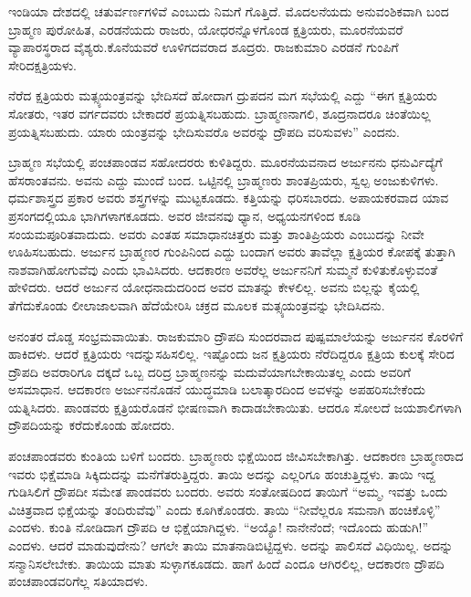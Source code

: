 \vskip 0.1cm

ಇಂಡಿಯಾ ದೇಶದಲ್ಲಿ ಚತುರ್ವರ್ಣಗಳಿವೆ ಎಂಬುದು ನಿಮಗೆ ಗೊತ್ತಿದೆ. ಮೊದಲನೆಯದು ಅನುವಂಶಿಕವಾಗಿ ಬಂದ ಬ್ರಾಹ್ಮಣ ಪುರೋಹಿತ, ಎರಡನೆಯದು ರಾಜರು, ಯೋಧರನ್ನೊಳಗೊಂಡ ಕ್ಷತ್ರಿಯರು, ಮೂರನೆಯವರೆ ವ್ಯಾಪಾರಸ್ಥರಾದ ವೈಶ್ಯರು.\break ಕೊನೆಯವರೆ ಊಳಿಗದವರಾದ ಶೂದ್ರರು. ರಾಜಕುಮಾರಿ ಎರಡನೆ ಗುಂಪಿಗೆ ಸೇರಿದ\break ಕ್ಷತ್ರಿಯಳು.

\vskip 0.1cm

ನೆರೆದ ಕ್ಷತ್ರಿಯರು ಮತ್ಸ್ಯಯಂತ್ರವನ್ನು ಭೇದಿಸದೆ ಹೋದಾಗ ದ್ರುಪದನ ಮಗ ಸಭೆಯಲ್ಲಿ ಎದ್ದು “ಈಗ ಕ್ಷತ್ರಿಯರು ಸೋತರು, ಇತರ ವರ್ಗದವರು ಬೇಕಾದರೆ ಪ್ರಯತ್ನಿಸಬಹುದು. ಬ್ರಾಹ್ಮಣನಾಗಲಿ, ಶೂದ್ರನಾದರೂ ಚಿಂತೆಯಿಲ್ಲ ಪ್ರಯತ್ನಿಸಬಹುದು. ಯಾರು ಯಂತ್ರವನ್ನು ಭೇದಿಸುವರೊ ಅವರನ್ನು ದ್ರೌಪದಿ ವರಿಸುವಳು” ಎಂದನು.

\vskip 0.1cm

ಬ್ರಾಹ್ಮಣ ಸಭೆಯಲ್ಲಿ ಪಂಚಪಾಂಡವ ಸಹೋದರರು ಕುಳಿತಿದ್ದರು. ಮೂರನೆಯವನಾದ ಅರ್ಜುನನು ಧನುರ್ವಿದ್ಯೆಗೆ ಹೆಸರಾಂತವನು. ಅವನು ಎದ್ದು ಮುಂದೆ ಬಂದ. ಒಟ್ಟಿನಲ್ಲಿ ಬ್ರಾಹ್ಮಣರು ಶಾಂತಪ್ರಿಯರು, ಸ್ವಲ್ಪ ಅಂಜುಕುಳಿಗಳು. ಧರ್ಮಶಾಸ್ತ್ರದ ಪ್ರಕಾರ ಅವರು ಶಸ್ತ್ರಗಳನ್ನು ಮುಟ್ಟಕೂಡದು. ಕತ್ತಿಯನ್ನು ಧರಿಸಬಾರದು. ಅಪಾಯಕರವಾದ ಯಾವ ಪ್ರಸಂಗದಲ್ಲಿಯೂ ಭಾಗಿಗಳಾಗಕೂಡದು. ಅವರ ಜೀವನವು ಧ್ಯಾನ, ಅಧ್ಯಯನಗಳಿಂದ ಕೂಡಿ ಸಂಯಮಪೂರಿತವಾದುದು. ಅವರು ಎಂತಹ ಸಮಾಧಾನಚಿತ್ತರು ಮತ್ತು ಶಾಂತಿಪ್ರಿಯರು ಎಂಬುದನ್ನು ನೀವೇ ಊಹಿಸಬಹುದು. ಅರ್ಜುನ ಬ್ರಾಹ್ಮಣರ ಗುಂಪಿನಿಂದ ಎದ್ದು ಬಂದಾಗ ಅವರು ತಾವೆಲ್ಲಾ ಕ್ಷತ್ರಿಯರ ಕೋಪಕ್ಕೆ ತುತ್ತಾಗಿ ನಾಶವಾಗಿ\break ಹೋಗುವೆವು ಎಂದು ಭಾವಿಸಿದರು. ಆದಕಾರಣ ಅವರೆಲ್ಲ ಅರ್ಜುನನಿಗೆ ಸುಮ್ಮನೆ ಕುಳಿತುಕೊಳ್ಳುವಂತೆ ಹೇಳಿದರು. ಆದರೆ ಅರ್ಜುನ ಯೋಧನಾದುದರಿಂದ ಅವರ ಮಾತನ್ನು ಕೇಳಲಿಲ್ಲ. ಅವನು ಬಿಲ್ಲನ್ನು ಕೈಯಲ್ಲಿ ತೆಗೆದುಕೊಂಡು ಲೀಲಾಜಾಲವಾಗಿ ಹೆದೆಯೇರಿಸಿ ಚಕ್ರದ ಮೂಲಕ ಮತ್ಸ್ಯಯಂತ್ರವನ್ನು ಭೇದಿಸಿದನು.

ಅನಂತರ ದೊಡ್ಡ ಸಂಭ್ರಮವಾಯಿತು. ರಾಜಕುಮಾರಿ ದ್ರೌಪದಿ ಸುಂದರವಾದ ಪುಷ್ಪಮಾಲೆಯನ್ನು ಅರ್ಜುನನ ಕೊರಳಿಗೆ ಹಾಕಿದಳು. ಆದರೆ ಕ್ಷತ್ರಿಯರು ಇದನ್ನು\break ಸಹಿಸಲಿಲ್ಲ. ಇಷ್ಟೊಂದು ಜನ ಕ್ಷತ್ರಿಯರು ನೆರೆದಿದ್ದರೂ ಕ್ಷತ್ರಿಯ ಕುಲಕ್ಕೆ ಸೇರಿದ ದ್ರೌಪದಿ ಅವರಾರಿಗೂ ದಕ್ಕದೆ ಒಬ್ಬ ದರಿದ್ರ ಬ್ರಾಹ್ಮಣನನ್ನು ಮದುವೆಯಾಗಬೇಕಾಯಿತಲ್ಲ ಎಂದು ಅವರಿಗೆ ಅಸಮಾಧಾನ. ಆದಕಾರಣ ಅರ್ಜುನನೊಡನೆ ಯುದ್ಧಮಾಡಿ ಬಲಾತ್ಕಾರದಿಂದ ಅವಳನ್ನು ಅಪಹರಿಸಬೇಕೆಂದು ಯತ್ನಿಸಿದರು. ಪಾಂಡವರು ಕ್ಷತ್ರಿಯರೊಡನೆ ಭೀಷಣವಾಗಿ ಕಾದಾಡಬೇಕಾಯಿತು. ಆದರೂ ಸೋಲದೆ ಜಯಶಾಲಿಗಳಾಗಿ ದ್ರೌಪದಿಯನ್ನು ಕರೆದುಕೊಂಡು ಹೋದರು.

ಪಂಚಪಾಂಡವರು ಕುಂತಿಯ ಬಳಿಗೆ ಬಂದರು. ಬ್ರಾಹ್ಮಣರು ಭಿಕ್ಷೆಯಿಂದ ಜೀವಿಸಬೇಕಾಗಿತ್ತು. ಆದಕಾರಣ ಬ್ರಾಹ್ಮಣರಾದ ಇವರು ಭಿಕ್ಷೆಮಾಡಿ ಸಿಕ್ಕಿದುದನ್ನು ಮನೆಗೆ\break ತರುತ್ತಿದ್ದರು. ತಾಯಿ ಅದನ್ನು ಎಲ್ಲರಿಗೂ ಹಂಚುತ್ತಿದ್ದಳು. ತಾಯಿ ಇದ್ದ ಗುಡಿಸಿಲಿಗೆ ದ್ರೌಪದೀ ಸಮೇತ ಪಾಂಡವರು ಬಂದರು. ಅವರು ಸಂತೋಷದಿಂದ ತಾಯಿಗೆ “ಅಮ್ಮ, ಇವತ್ತು ಒಂದು ವಿಚಿತ್ರವಾದ ಭಿಕ್ಷೆಯನ್ನು ತಂದಿರುವೆವು” ಎಂದು ಕೂಗಿಕೊಂಡರು. ತಾಯಿ “ನೀವೆಲ್ಲರೂ ಸಮನಾಗಿ ಹಂಚಿಕೊಳ್ಳಿ” ಎಂದಳು. ಕುಂತಿ ನೋಡಿದಾಗ ದ್ರೌಪದಿ ಆ ಭಿಕ್ಷೆಯಾಗಿದ್ದಳು. “ಅಯ್ಯೊ! ನಾನೇನೆಂದೆ; ಇದೊಂದು ಹುಡುಗಿ!” ಎಂದಳು. ಆದರೆ ಮಾಡುವುದೇನು? ಆಗಲೇ ತಾಯಿ ಮಾತನಾಡಿಬಿಟ್ಟಿದ್ದಳು. ಅದನ್ನು ಪಾಲಿಸದೆ ವಿಧಿಯಿಲ್ಲ. ಅದನ್ನು ಸನ್ಮಾನಿಸಲೇಬೇಕು. ತಾಯಿಯ ಮಾತು ಸುಳ್ಳಾಗಕೂಡದು. ಹಾಗೆ ಹಿಂದೆ ಎಂದೂ ಆಗಿರಲಿಲ್ಲ, ಆದಕಾರಣ ದ್ರೌಪದಿ ಪಂಚಪಾಂಡವರಿಗೆಲ್ಲ ಸತಿಯಾದಳು.

